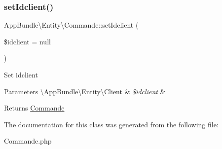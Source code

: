 \subsubsection{\texorpdfstring{set\+Idclient()}{setIdclient()}}
{\footnotesize\ttfamily App\+Bundle\textbackslash{}\+Entity\textbackslash{}\+Commande\+::set\+Idclient (\begin{DoxyParamCaption}\item[{\textbackslash{}\hyperlink{class_app_bundle_1_1_entity_1_1_client}{App\+Bundle\textbackslash{}\+Entity\textbackslash{}\+Client}}]{\$idclient = {\ttfamily null} }\end{DoxyParamCaption})}

Set idclient


\begin{DoxyParams}[1]{Parameters}
\textbackslash{}\+App\+Bundle\textbackslash{}\+Entity\textbackslash{}\+Client & {\em \$idclient} & \\
\hline
\end{DoxyParams}
\begin{DoxyReturn}{Returns}
\hyperlink{class_app_bundle_1_1_entity_1_1_commande}{Commande} 
\end{DoxyReturn}


The documentation for this class was generated from the following file\+:\begin{DoxyCompactItemize}
\item 
Commande.\+php\end{DoxyCompactItemize}
